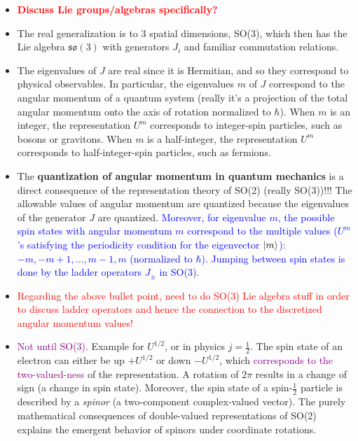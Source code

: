     \begin{itemize}
        \item \textcolor{red}{\textbf{Discuss Lie groups/algebras specifically?}}
        \item The real generalization is to 3 spatial dimensions, SO(3), which then has the Lie algebra $\mathfrak{so}(3)$ with generators $J_i$ and familiar commutation relations.
        \item The eigenvalues of $J$ are real since it is Hermitian, and so they correspond to physical observables. In particular, the eigenvalues $m$ of $J$ correspond to the angular momentum of a quantum system (really it's a projection of the total angular momentum onto the axis of rotation normalized to $\hbar$). When $m$ is an integer, the representation $U^m$ corresponds to integer-spin particles, such as bosons or gravitons. When $m$ is a half-integer, the representation $U^m$ corresponds to half-integer-spin particles, such as fermions.
        \item The \textbf{quantization of angular momentum in quantum mechanics} is a direct consequence of the representation theory of SO(2) (really SO(3))!!! The allowable values of angular momentum are quantized because the eigenvalues of the generator $J$ are quantized. \textcolor{blue}{Moreover, for eigenvalue $m$, the possible spin states with angular momentum $m$ correspond to the multiple values ($U^m$'s satisfying the periodicity condition for the eigenvector $\ket{m}$): $-m, -m+1, \dots, m-1, m$ (normalized to $\hbar$). Jumping between spin states is done by the ladder operators $J_\pm$ in SO(3).}
        \item \textcolor{red}{Regarding the above bullet point, need to do SO(3) Lie algebra stuff in order to discuss ladder operators and hence the connection to the discretized angular momentum values!}
        \item \textcolor{purple}{Not until SO(3).} Example for $U^{1/2}$, or in physics $j=\frac{1}{2}$. The spin state of an electron can either be up $+U^{1/2}$ or down $-U^{1/2}$, which \textcolor{purple}{corresponds to the two-valued-ness} of the representation. A rotation of $2\pi$ results in a change of sign (a change in spin state). Moreover, the spin state of a spin-$\frac{1}{2}$ particle is described by a \textit{spinor} (a two-component complex-valued vector). The purely mathematical consequences of double-valued representations of SO(2) explains the emergent behavior of spinors under coordinate rotations.
    \end{itemize}